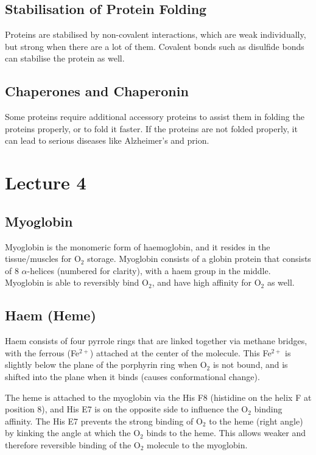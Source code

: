 \documentclass[a4paper, 12pt]{report}
\newcommand{\mychapter}[2]{
    \setcounter{chapter}{#1}
    \setcounter{section}{0}
    \chapter*{#2}
    \addcontentsline{toc}{chapter}{#2}
}
\begin{document}
\section{Stabilisation of Protein Folding}

Proteins are stabilised by non-covalent interactions, which are weak individually, but strong when there are a lot of them.
Covalent bonds such as disulfide bonds can stabilise the protein as well.


\section{Chaperones and Chaperonin}

Some proteins require additional accessory proteins to assist them in folding the proteins properly, or to fold it faster.
If the proteins are not folded properly, it can lead to serious diseases like Alzheimer's and prion.

\mychapter{4}{Lecture 4}

\section{Myoglobin}

Myoglobin is the monomeric form of haemoglobin, and it resides in the tissue/muscles for O$_2$ storage.
Myoglobin consists of a globin protein that consists of 8 $\alpha$-helices (numbered for clarity), with a haem group in the middle.
Myoglobin is able to reversibly bind O$_2$, and have high affinity for O$_2$ as well.

\section{Haem (Heme)}

Haem consists of four pyrrole rings that are linked together via methane bridges, with the ferrous (Fe$^{2+}$) attached at the center of the molecule.
This Fe$^{2+}$ is slightly below the plane of the porphyrin ring when O$_2$ is not bound, and is shifted into the plane when it binds (causes conformational change).

The heme is attached to the myoglobin via the His F8 (histidine on the helix F at position 8), and His E7 is on the opposite side to influence the O$_2$ binding affinity.
The His E7 prevents the strong binding of O$_2$ to the heme (right angle) by kinking the angle at which the O$_2$ binds to the heme.
This allows weaker and therefore reversible binding of the O$_2$ molecule to the myoglobin.
\end{document}
